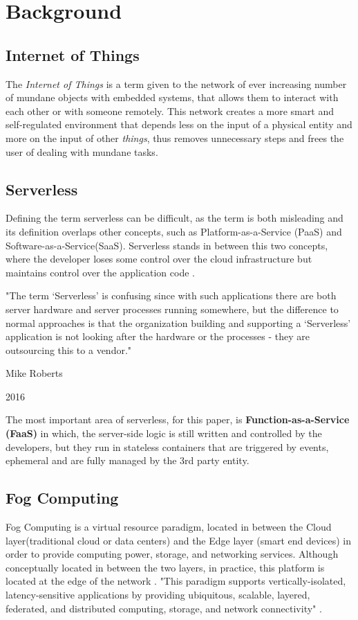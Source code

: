 \documentclass[conference]{IEEEtran}
\begin{document}
\section{Background}

\subsection{Internet of Things}\label{sec:dialecto}
The \textit{Internet of Things} is a term given to the network of ever increasing
number of mundane objects with embedded systems, that allows them to interact with
each other or with someone remotely. This network creates a more smart and self-regulated
environment that depends less on the input of a physical entity and more on the
input of other \textit{things}, thus removes unnecessary steps and frees the user
of dealing with mundane tasks.

\subsection{Serverless}
Defining the term serverless can be difficult, as the term is both misleading and
its definition overlaps other concepts, such as Platform-as-a-Service (PaaS) and
Software-as-a-Service(SaaS). Serverless stands in between this two concepts, where
the developer loses some control over the cloud infrastructure but maintains
control over the application code \cite{kn:Baldini}.

"The term ‘Serverless’ is confusing since with such applications there are both
server hardware and server processes running somewhere, but the difference to
normal approaches is that the organization building and supporting a ‘Serverless’
application is not looking after the hardware or the processes - they are
outsourcing this to a vendor." 

\hfill Mike Roberts

\hfill 2016

The most important area of serverless, for this paper, is
\textbf{Function-as-a-Service (FaaS)} in which, the server-side logic is still
written and controlled by the developers, but they run in stateless containers
that are triggered by events, ephemeral and are fully managed by the 3rd party
entity.

\subsection{Fog Computing}
Fog Computing is a virtual resource paradigm, located in between the Cloud
layer(traditional cloud or data centers) and the Edge layer (smart end devices) in
order to provide computing power, storage, and networking services. Although
conceptually located in between the two layers, in practice, this platform is located at the
edge of the network \cite{kn:Bonomi}. "This paradigm supports vertically-isolated,
latency-sensitive applications by providing ubiquitous, scalable, layered,
federated, and distributed computing, storage, and network connectivity"
\citep{kn:Iorga2017}. 
\end{document}

